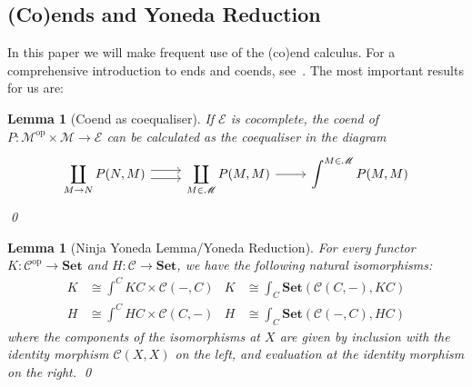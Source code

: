 \documentclass[11pt,letterpaper]{article}
\theoremstyle{plain}
\newtheorem{lemma}[theorem]{Lemma}
\theoremstyle{definition}
\newcommand{\C}{\mathscr{C}}
\newcommand{\E}{\mathscr{E}}
\newcommand{\M}{\mathscr{M}}
\newcommand{\Set}{\mathbf{Set}}
\newcommand{\op}{\mathrm{op}}
\newcommand{\todo}[1]{\textcolor{red}{\small #1}}
\begin{document}

\subsection{(Co)ends and Yoneda Reduction}

In this paper we will make frequent use of the (co)end calculus. For a comprehensive introduction to ends and coends, see~\cite{CoendCofriend}. The most important results for us are:

\begin{lemma}[Coend as coequaliser]\label{lemma:calculate-coend}
If $\E$ is cocomplete, the coend of $P : \M^\op \times \M \to \E$ can be calculated as the coequaliser in the diagram
\[
  \begin{tikzcd}
    \displaystyle \coprod_{M \to N} P(N, M) \ar[r,shift left=.75ex]  \ar[r,shift right=.75ex] & \displaystyle\coprod_{M \in \M} P(M, M) \ar[r] & \displaystyle\int^{M \in \M} P(M, M)
  \end{tikzcd}
\]
\qed
\end{lemma}

\begin{lemma}[Ninja Yoneda Lemma/Yoneda Reduction]
For every functor $K : \C^\op \to \Set$ and $H : \C \to \Set$, we have the following natural isomorphisms:
\begin{align*}
K &\cong \int^C KC \times \C(-,C) &
K &\cong \int_C \Set(\C(C,-), KC) \\
H &\cong \int^C HC \times \C(C,-)  &
H &\cong \int_C \Set(\C(-,C), HC)
\end{align*}
where the components of the isomorphisms at $X$ are given by inclusion with the identity morphism $\C(X, X)$ on the left, and evaluation at the identity morphism on the right.
\qed
\end{lemma}
\end{document}
